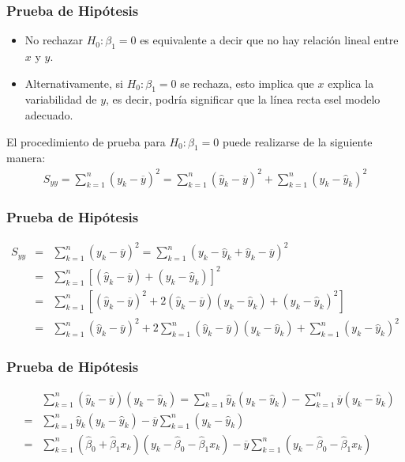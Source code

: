 \documentclass{beamer}
\begin{document}
\begin{frame}\frametitle{Prueba de Hip\'otesis}
\begin{itemize}
\item No rechazar $H_{0}:\beta_{1}=0$ es equivalente a decir que no hay relaci\'on lineal entre $x$ y $y$.
\item Alternativamente, si $H_{0}:\beta_{1}=0$ se rechaza, esto implica que $x$ explica la variabilidad de $y$, es decir, podría significar que la l\'inea recta esel modelo adecuado.
\end{itemize}
El procedimiento de prueba para $H_{0}:\beta_{1}=0$ puede realizarse de la siguiente manera:
\begin{eqnarray*}
S_{yy}=\sum_{k=1}^{n}\left(y_{k}-\overline{y}\right)^{2}=\sum_{k=1}^{n}\left(\hat{y}_{k}-\overline{y}\right)^{2}+\sum_{k=1}^{n}\left(y_{k}-\hat{y}_{k}\right)^{2}
\end{eqnarray*}

\end{frame}


\begin{frame}\frametitle{Prueba de Hip\'otesis}
\begin{eqnarray*}
S_{yy}&=&\sum_{k=1}^{n}\left(y_{k}-\overline{y}\right)^{2}=\sum_{k=1}^{n}\left(y_{k}-\hat{y}_{k}+\hat{y}_{k}-\overline{y}\right)^{2}\\
&=&\sum_{k=1}^{n}\left[\left(\hat{y}_{k}-\overline{y}\right)+\left(y_{k}-\hat{y}_{k}\right)\right]^{2}\\
&=&\sum_{k=1}^{n}\left[\left(\hat{y}_{k}-\overline{y}\right)^{2}+2\left(\hat{y}_{k}-\overline{y}\right)\left(y_{k}-\hat{y}_{k}\right)+\left(y_{k}-\hat{y}_{k}\right)^{2}\right]\\
&=&\sum_{k=1}^{n}\left(\hat{y}_{k}-\overline{y}\right)^{2}+2\sum_{k=1}^{n}\left(\hat{y}_{k}-\overline{y}\right)\left(y_{k}-\hat{y}_{k}\right)+\sum_{k=1}^{n}\left(y_{k}-\hat{y}_{k}\right)^{2}
\end{eqnarray*}
\end{frame}


\begin{frame}\frametitle{Prueba de Hip\'otesis}
\begin{eqnarray*}
&&\sum_{k=1}^{n}\left(\hat{y}_{k}-\overline{y}\right)\left(y_{k}-\hat{y}_{k}\right)=\sum_{k=1}^{n}\hat{y}_{k}\left(y_{k}-\hat{y}_{k}\right)-\sum_{k=1}^{n}\overline{y}\left(y_{k}-\hat{y}_{k}\right)\\
&=&\sum_{k=1}^{n}\hat{y}_{k}\left(y_{k}-\hat{y}_{k}\right)-\overline{y}\sum_{k=1}^{n}\left(y_{k}-\hat{y}_{k}\right)\\
&=&\sum_{k=1}^{n}\left(\hat{\beta}_{0}+\hat{\beta}_{1}x_{k}\right)\left(y_{k}-\hat{\beta}_{0}-\hat{\beta}_{1}x_{k}\right)-\overline{y}\sum_{k=1}^{n}\left(y_{k}-\hat{\beta}_{0}-\hat{\beta}_{1}x_{k}\right)
\end{eqnarray*}
\end{frame}
\end{document}
